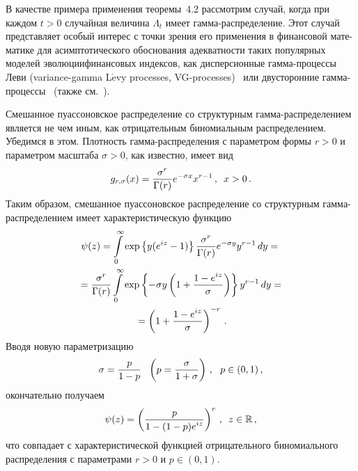 \begin{multicols}{2}
В качестве примера применения теоремы~4.2 рассмотрим случай, когда
при каждом $t>0$ случайная величина $\Lambda_t$ имеет
гам\-ма-рас\-пре\-де\-ле\-ние. Этот случай представляет особый интерес с
точки зрения его применения в финансовой мате-\linebreak матике для
асимптотического обоснования адекватности таких популярных моделей
эволюции\linebreak финансовых индексов, как дисперсионные гам\-ма-про\-цес\-сы Леви
(variance-gamma L$\acute{\mbox{e}}$vy processes, VG-processes)~\cite{Madan} или
двусторонние гам\-ма-про\-цес\-сы~\cite{Carr} (также см.~\cite{Korolev2010}).

Смешанное пуассоновское распределение со структурным
гам\-ма-рас\-пре\-де\-ле\-ни\-ем является не чем иным, как отрицательным
биномиальным распределением. Убедимся в этом. Плотность
гам\-ма-рас\-пре\-де\-ле\-ния с параметром формы $r>0$ и параметром масштаба
$\sigma>0$, как известно, имеет вид
$$
g_{r,\sigma}(x)=\displaystyle\frac{\displaystyle \sigma^r\mathstrut}{\displaystyle \Gamma(r)\mathstrut}e^{-\sigma x}x^{r-1}\,,\enskip x>0\,.
$$
Таким образом, смешанное пуассоновское распределение со
структурным гам\-ма-рас\-пре\-де\-ле\-ни\-ем имеет характеристическую функцию
\begin{multline*}
\psi(z)=\int\limits_{0}^{\infty}\exp\left\{y(e^{iz}-1)\right\}\displaystyle\frac{\displaystyle \sigma^r\mathstrut}{\displaystyle \Gamma(r)\mathstrut}
e^{-\sigma y}y^{r-1}\,dy={}\\
{}=
\displaystyle\frac{\displaystyle \sigma^r\mathstrut}{\displaystyle \Gamma(r)\mathstrut}\int\limits_{0}^{\infty}\exp\left\{-\sigma
y\left(1+ \displaystyle\frac{\displaystyle 1-e^{iz}\mathstrut}{\displaystyle \sigma\mathstrut}\right)\right\}y^{r-1}\,dy={}\\
{}=
\left(1+\displaystyle\frac{\displaystyle 1-e^{iz}\mathstrut}{\displaystyle \sigma\mathstrut}\right)^{-r}\,.
\end{multline*}
Вводя новую параметризацию
$$
\si=\fr{p}{1-p}\  \ \left(p=\fr{\si}{1+\si}\right)\,,\ \ 
p\in(0,1)\,,
$$
окончательно получаем
$$
\psi(z)=\left(\displaystyle\frac{\displaystyle p\mathstrut}{\displaystyle 1-(1-p)e^{iz}\mathstrut}\right)^r\,,\enskip z\in\mathbb R\,,
$$
что совпадает с характеристической функцией отрицательного
биномиального распределения с параметрами $r>0$ и $p\in(0,1)$.


\end{multicols}
